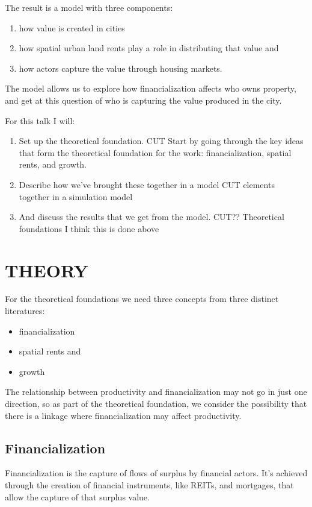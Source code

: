 \documentclass[]{article}
\begin{document}
The result is a model with three components:
\begin{enumerate}
    \item how value is created in cities
    \item how spatial urban land rents play a role in distributing that value and
    \item how actors capture the value through housing markets.
\end{enumerate}
The model allows us to explore how financialization affects who owns property, and get at this question of who is capturing the value produced in the city.

For this talk I will:

\begin{enumerate}
    \item Set up the theoretical foundation. CUT Start by going through the key ideas that form the theoretical foundation for the work: financialization, spatial rents, and growth.
    \item Describe how we’ve brought these together in a model CUT elements together in a simulation model
    \item And discuss the results that we get from the model. CUT?? Theoretical foundations I think this is done above
\end{enumerate}

\section{ THEORY}
For the theoretical foundations we need three concepts from three distinct literatures:

\begin{itemize}
    \item financialization
    \item spatial rents and
    \item growth
\end{itemize}

The relationship between productivity and financialization may not go in just one direction, so as part of the theoretical foundation, we consider the possibility that there is a linkage where financialization may affect productivity.

\subsection{Financialization}
Financialization is the capture of flows of surplus by financial actors. 
It’s achieved through the creation of financial instruments, like REITs, and mortgages, that allow the capture of that surplus value.
\end{document}
